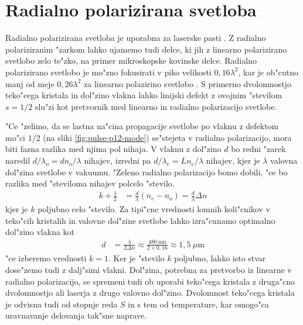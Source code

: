 \documentclass[12pt,twoside,openright,final,a4paper]{report}
\begin{document}

\section{Radialno polarizirana svetloba}
Radialno polarizirana svetloba je uporabna za laserske pasti \cite{radial-trap}.
Z radialno polariziranim "zarkom lahko ujamemo tudi delce, ki jih z linearno polarizirano svetlobo zelo te"zko, na primer mikroskopske kovinske delce.
Radialno polarizirano svetlobo je mo"zno fokusirati v piko velikosti $0,\!16\lambda^2$, kar je ob"cutno manj od meje $0,\!26\lambda^2$ za linearno polazirino svetlobo \cite{radial-focus, kozawa-sato-focal-spot}. 
S primerno dvolomnostjo teko"cega kristala in dol"zino vlakna lahko linijski defekt z ovojnim "stevilom $s=1/2$ slu"zi kot pretvornik med linearno in radialno polarizacijo svetlobe. 

"Ce "zelimo, da se lastna na"cina propagacije svetlobe po vlaknu z defektom mo"ci $1/2$ (na sliki \ref{fig:pulse-p12-mode}) se"stejeta v radialno polarizacijo, mora biti fazna razlika med njima pol nihaja. 
V vlaknu z dol"zino $d$ bo redni "zarek naredil $d/\lambda_o = d n_o/\lambda$ nihajev, izredni pa $d/\lambda_e = Ln_e/\lambda$ nihajev, kjer je $\lambda$ valovna dol"zina svetlobe v vakuumu. 
"Zeleno radialno polarizacijo bomo dobili, "ce bo razlika med "steviloma nihajev polcelo "stevilo. 
\begin{align}
  k + \frac{1}{2} &= \frac{d}{\lambda} \left( n_e - n_o \right) = \frac{d}{\lambda} \Delta n
\end{align}
kjer je $k$ poljubno celo "stevilo. Za tipi"cne vrednosti lomnih koli"cnikov v teko"cih kristalih in valovne dol"zine svetlobe lahko izra"cunamo optimalno dol"zino vlakna kot
\begin{align}
 d &= \frac{\lambda}{2\Delta n} \approx \frac{480~\mathrm{nm}}{2 \times 0,\!16} \approx 1,\!5~\mu\mathrm{m}
\end{align}
"ce izberemo vrednosti $k=1$. Ker je "stevilo $k$ poljubno, lahko isto stvar dose"zemo tudi z dalj"simi vlakni. 
Dol"zina, potrebna za pretvorbo iz linearne v radialno polarizacijo, se spremeni tudi ob uporabi teko"cega kristala z druga"cno dvolomnostjo ali laserja z drugo valovno dol"zino. 
Dvolomnost teko"cega kristala je odvisna tudi od stopnje reda $S$ in s tem od temperature, kar omogo"ca uravnavanje delovanja tak"sne naprave. 
\end{document}
